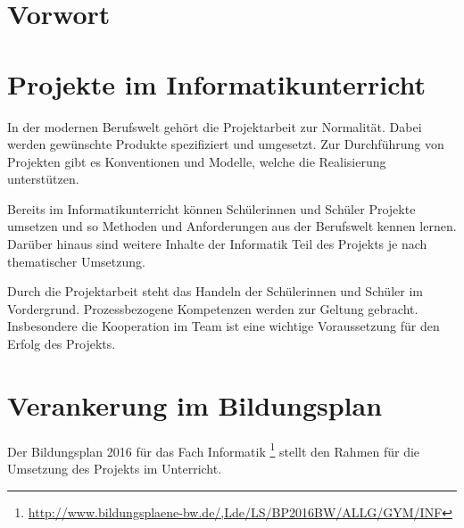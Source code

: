 \documentclass[a4paper,12pt]{article}
\newcommand{\sus}{Schülerinnen und Schüler}
\begin{document}
    \maketitle


\section{Vorwort}

\section{Projekte im Informatikunterricht}
    In der modernen Berufswelt gehört die Projektarbeit zur Normalität.
    Dabei werden gewünschte Produkte spezifiziert und umgesetzt.
    Zur Durchführung von Projekten gibt es Konventionen und Modelle, 
    welche die Realisierung unterstützen.
    
    Bereits im Informatikunterricht können \sus{} Projekte umsetzen
    und so Methoden und Anforderungen aus der Berufswelt kennen lernen.
    Darüber hinaus sind weitere Inhalte der Informatik Teil des Projekts 
    je nach thematischer Umsetzung.

    Durch die Projektarbeit steht das Handeln der \sus{} im Vordergrund.
    Prozessbezogene Kompetenzen werden zur Geltung gebracht.
    Insbesondere die Kooperation im Team ist eine wichtige Voraussetzung 
    für den Erfolg des Projekts.

\section{Verankerung im Bildungsplan}

    Der Bildungsplan 2016 für das Fach Informatik 
    \footnote{\url{http://www.bildungsplaene-bw.de/,Lde/LS/BP2016BW/ALLG/GYM/INF}}
    stellt den Rahmen für die Umsetzung des Projekts im Unterricht.
\end{document}
